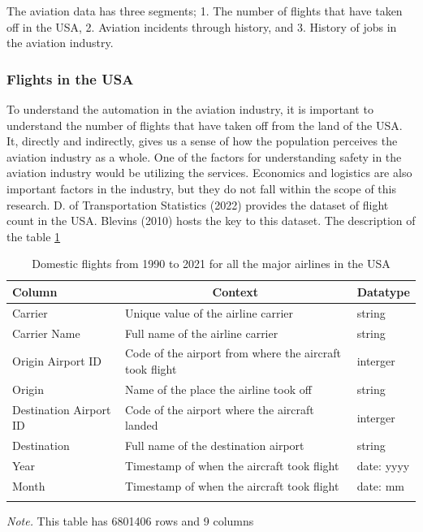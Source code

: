 \documentclass[
  man,floatsintext]{apa7}
\begin{document}
The aviation data has three segments; 1. The number of flights that have taken off in the USA, 2. Aviation incidents through history, and 3. History of jobs in the aviation industry.\\

\hypertarget{flights-in-the-usa}{%
\subsubsection{Flights in the USA}\label{flights-in-the-usa}}

To understand the automation in the aviation industry, it is important to understand the number of flights that have taken off from the land of the USA. It, directly and indirectly, gives us a sense of how the population perceives the aviation industry as a whole. One of the factors for understanding safety in the aviation industry would be utilizing the services. Economics and logistics are also important factors in the industry, but they do not fall within the scope of this research. D. of Transportation Statistics (2022) provides the dataset of flight count in the USA. Blevins (2010) hosts the key to this dataset. The description of the table \ref{tab:aviation-flights}\\

\begin{table}[tbp]

\begin{center}
\begin{threeparttable}

\caption{\label{tab:aviation-flights}Domestic flights from 1990 to 2021 for all the major airlines in the USA}

\begin{tabular}{lll}
\toprule
Column & \multicolumn{1}{c}{Context} & \multicolumn{1}{c}{Datatype}\\
\midrule
Carrier & Unique value of the airline carrier & string\\
Carrier Name & Full name of the airline carrier & string\\
Origin Airport ID & Code of the airport from where the aircraft took flight & interger\\
Origin & Name of the place the airline took off & string\\
Destination Airport ID & Code of the airport where the aircraft landed & interger\\
Destination & Full name of the destination airport & string\\
Year & Timestamp of when the aircraft took flight & date: yyyy\\
Month & Timestamp of when the aircraft took flight & date: mm\\
\bottomrule
\addlinespace
\end{tabular}

\begin{tablenotes}[para]
\normalsize{\textit{Note.} This table has 6801406 rows and 9 columns}
\end{tablenotes}

\end{threeparttable}
\end{center}

\end{table}
\end{document}
